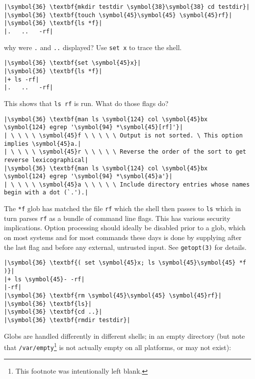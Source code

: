 \documentclass[10pt,a4paper]{article}
\begin{document}
\begin{lstlisting}
|\symbol{36} \textbf{mkdir testdir \symbol{38}\symbol{38} cd testdir}|
|\symbol{36} \textbf{touch \symbol{45}\symbol{45} \symbol{45}rf}|
|\symbol{36} \textbf{ls *f}|
|.   ..   -rf|
\end{lstlisting}

why were \texttt{.} and \texttt{..} displayed? Use \texttt{set x} to trace the shell.

\begin{lstlisting}
|\symbol{36} \textbf{set \symbol{45}x}|
|\symbol{36} \textbf{ls *f}|
|+ ls -rf|
|.   ..   -rf|
\end{lstlisting}

This shows that \texttt{ls rf} is run. What do those flags do?

\begin{lstlisting}
|\symbol{36} \textbf{man ls \symbol{124} col \symbol{45}bx \symbol{124} egrep '\symbol{94} *\symbol{45}[rf]'}|
| \ \ \ \ \symbol{45}f \ \ \ \ \ Output is not sorted. \ This option implies \symbol{45}a.|
| \ \ \ \ \symbol{45}r \ \ \ \ \ Reverse the order of the sort to get reverse lexicographical|
|\symbol{36} \textbf{man ls \symbol{124} col \symbol{45}bx \symbol{124} egrep '\symbol{94} *\symbol{45}a'}|
| \ \ \ \ \symbol{45}a \ \ \ \ \ Include directory entries whose names begin with a dot (`.').|
\end{lstlisting}

The \texttt{*f} glob has matched the file \texttt{rf} which
the shell then passes to \texttt{ls} which in turn parses
\texttt{rf} as a bundle of command line flags. This has
various security implications. Option processing should ideally be
disabled prior to a glob, which on most systems and for most commands
these days is done by supplying \texttt{} after
the last flag and before any external, untrusted input. See
\texttt{getopt(3)} for details.

\begin{lstlisting}
|\symbol{36} \textbf{( set \symbol{45}x; ls \symbol{45}\symbol{45} *f )}|
|+ ls \symbol{45}- -rf|
|-rf|
|\symbol{36} \textbf{rm \symbol{45}\symbol{45} \symbol{45}rf}|
|\symbol{36} \textbf{ls}|
|\symbol{36} \textbf{cd ..}|
|\symbol{36} \textbf{rmdir testdir}|
\end{lstlisting}

Globs are handled differently in different shells; in an empty directory
(but note that \texttt{/var/empty}\footnote{This footnote was
intentionally left blank.} is not actually empty on all platforms, or
may not exist):
\end{document}
